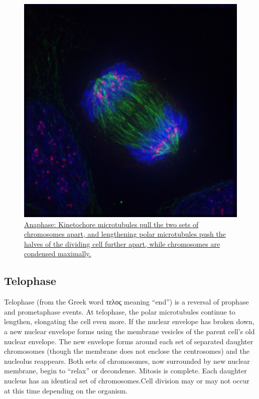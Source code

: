 \begin{figure}

{\centering \includegraphics[width=0.7\linewidth]{./figures/reproduction/Anaphase_IF} 

}

\caption{\href{https://commons.wikimedia.org/wiki/File:Anaphase_IF.jpg}{Anaphase: Kinetochore microtubules pull the two sets of chromosomes apart, and lengthening polar microtubules push the halves of the dividing cell further apart, while chromosomes are condensed maximally.}}\label{fig:anaphase}
\end{figure}

\hypertarget{telophase}{%
\subsection{Telophase}\label{telophase}}

Telophase (from the Greek word τελος meaning ``end'') is a reversal of prophase and prometaphase events. At telophase, the polar microtubules continue to lengthen, elongating the cell even more. If the nuclear envelope has broken down, a new nuclear envelope forms using the membrane vesicles of the parent cell's old nuclear envelope. The new envelope forms around each set of separated daughter chromosomes (though the membrane does not enclose the centrosomes) and the nucleolus reappears. Both sets of chromosomes, now surrounded by new nuclear membrane, begin to ``relax'' or decondense. Mitosis is complete. Each daughter nucleus has an identical set of chromosomes.Cell division may or may not occur at this time depending on the organism.



